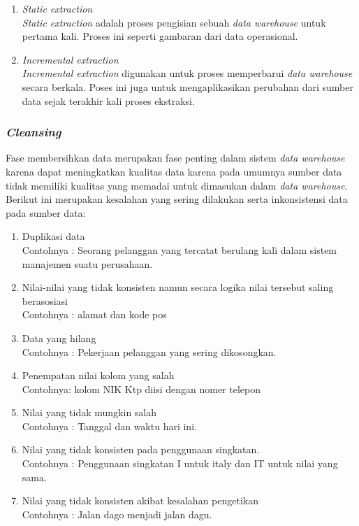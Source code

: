 \begin{enumerate}
	\item \textit{Static extraction}\\
	\textit{Static extraction} adalah proses pengisian sebuah \textit{data warehouse} untuk pertama kali. Proses ini seperti gambaran dari data operasional.
	\item \textit{Incremental extraction}\\
	\textit{Incremental extraction} digunakan untuk proses memperbarui \textit{data warehouse} secara berkala. Poses ini juga untuk mengaplikasikan perubahan dari sumber data sejak terakhir kali proses ekstraksi.
\end{enumerate}

\subsubsection{\textit{Cleansing}}
Fase membersihkan data merupakan fase penting dalam sistem \textit{data warehouse} karena dapat meningkatkan kualitas data karena pada umumnya sumber data tidak memiliki kualitas yang memadai untuk dimasukan dalam \textit{data warehouse}. Berikut ini merupakan kesalahan yang sering dilakukan serta inkonsistensi data pada sumber data\cite{Matteo:2009}:

\begin{enumerate}
	\item Duplikasi data\\
	Contohnya : Seorang pelanggan yang tercatat berulang kali dalam sistem manajemen suatu perusahaan.
	\item Nilai-nilai yang tidak konsisten namun secara logika nilai tersebut saling berasosiasi\\
	Contohnya : alamat dan kode pos
	\item Data yang hilang\\
	Contohnya : Pekerjaan pelanggan yang sering dikosongkan.
	\item Penempatan nilai kolom yang salah \\
	Contohnya: kolom NIK Ktp diisi dengan nomer telepon
	\item Nilai yang tidak mungkin salah \\
	Contohnya : Tanggal dan waktu hari ini.
	\item Nilai yang tidak konsisten pada penggunaan singkatan.\\
	Contohnya : Penggunaan singkatan I untuk italy dan IT untuk nilai yang sama.
	\item Nilai yang tidak konsisten akibat kesalahan pengetikan\\
	Contohnya : Jalan dago menjadi jalan dagu.
\end{enumerate}

